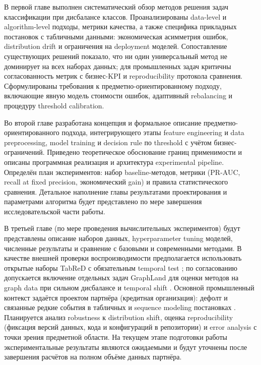 \label{sec:conclusion}
В первой главе выполнен систематический обзор методов решения задач классификации при дисбалансе классов. Проанализированы data-level и algorithm-level подходы, метрики качества, а также специфика прикладных постановок с табличными данными: экономическая асимметрия ошибок, distribution drift и ограничения на deployment моделей. Сопоставление существующих решений показало, что ни один универсальный метод не доминирует на всех наборах данных; для промышленных задач критичны согласованность метрик с бизнес-KPI и reproducibility протокола сравнения. Сформулированы требования к предметно-ориентированному подходу, включающие явную модель стоимости ошибок, адаптивный rebalancing и процедуру threshold calibration.

Во второй главе разработана концепция и формальное описание предметно-ориентированного подхода, интегрирующего этапы feature engineering и data preprocessing, model training и decision rule по threshold с учётом бизнес-ограничений. Приведено теоретическое обоснование границ применимости и описаны программная реализация и архитектура experimental pipeline. Определён план экспериментов: набор baseline-методов, метрики (PR-AUC, recall at fixed precision, экономический gain) и правила статистического сравнения. Детальное наполнение главы результатами проектирования и параметрами алгоритма будет представлено по мере завершения исследовательской части работы.

В третьей главе (по мере проведения вычислительных экспериментов) будут представлены описание наборов данных, hyperparameter tuning моделей, численные результаты и сравнение с базовыми и современными методами. В качестве внешней проверки воспроизводимости предполагается использовать открытые наборы TabReD с обязательным temporal test \cite{rubachev2025tabred}; по согласованию допускается включение отдельных задач GraphLand для оценки методов на graph data при сильном дисбалансе и temporal shift \cite{bazhenov2025graphland}. Основной промышленный контекст задаётся проектом партнёра (кредитная организация): дефолт и связанные редкие события в табличных и sequence modeling постановках \cite{smirnov2021habrcard,smirnov2022habrbki,meacca2022habraccount,nickimpark2023habrunified}. Планируется анализ robustness к distribution shift, оценка reproducibility (фиксация версий данных, кода и конфигураций в репозитории) и error analysis с точки зрения предметной области. На текущем этапе подготовки работы экспериментальные результаты являются ожидаемыми и будут уточнены после завершения расчётов на полном объёме данных партнёра.

